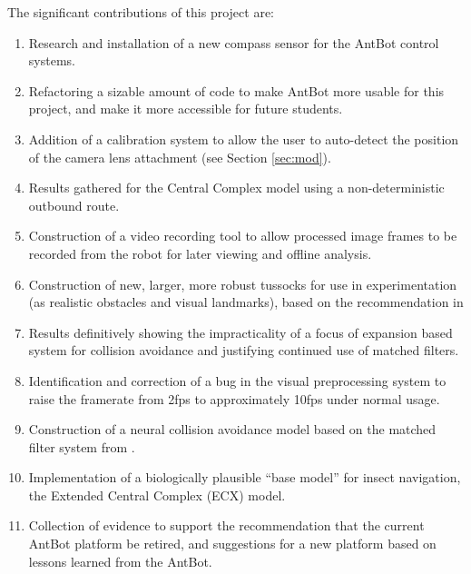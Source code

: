 \documentclass[a4paper,11pt,twoside,openright]{article}
\begin{document}
The significant contributions of this project are:
\begin{enumerate}
\item{
  Research and installation of a new compass sensor for the AntBot control
  systems.
}

\item{
  Refactoring a sizable amount of code to make AntBot more usable for this
  project, and make it more accessible for future students.
}

\item{
  Addition of a calibration system to allow the user to auto-detect the position
  of the camera lens attachment (see Section \ref{sec:mod}).
}

\item{
  Results gathered for the Central Complex model using a non-deterministic
  outbound route.
}

\item{
  Construction of a video recording tool to allow processed
  image frames to be recorded from the robot for later viewing and
  offline analysis.
}

\item{ Construction of new, larger, more robust tussocks for use in
  experimentation (as realistic obstacles and visual landmarks), based
  on the recommendation in \cite{Mitchell2018}}

\item{ Results definitively showing the impracticality of a focus of
    expansion based system for collision avoidance and justifying
    continued use of matched filters.
}

\item{ Identification and correction of a bug in the visual preprocessing system
  to raise the framerate from 2fps to approximately 10fps under normal usage.}

\item{ Construction of a neural collision avoidance model based on the
  matched filter system from \cite{Mitchell2018, Stewart2010}. }


\item{
  Implementation of a biologically plausible ``base model'' for
  insect navigation, the Extended Central Complex (ECX) model.
}

\item{ Collection of evidence to support the recommendation that the
  current AntBot platform be retired, and suggestions for a new
  platform based on lessons learned from the AntBot.  }

\end{enumerate}
\newpage
\end{document}
